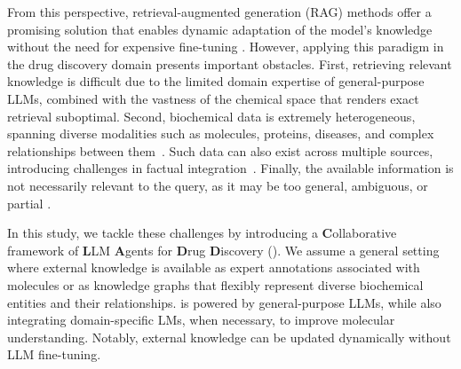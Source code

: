 From this perspective, retrieval-augmented generation (RAG) methods offer a promising solution that enables dynamic adaptation of the model's knowledge without the need for expensive fine-tuning \cite{gao2023retrieval,fan2024survey}.
However, applying this paradigm in the drug discovery domain presents important obstacles. First, retrieving relevant knowledge is difficult due to the limited domain expertise of general-purpose LLMs, combined with the vastness of the chemical space \cite{bohacek1996art} that renders exact retrieval suboptimal.
Second, biochemical data is extremely heterogeneous, spanning diverse modalities such as molecules, proteins, diseases, and complex relationships between them~\cite{wang2023scientific}. Such data can also exist across multiple sources, introducing challenges in factual integration~\cite{harris2023large}.
Finally, the available information is not necessarily relevant to the query, as it may be too general, ambiguous, or partial \cite{vamathevan2019applications}.

In this study, we tackle these challenges by introducing a \textbf{C}ollaborative framework of \textbf{L}LM \textbf{A}gents for \textbf{D}rug \textbf{D}iscovery (\proposed).
We assume a general setting where external knowledge is available as expert annotations associated with molecules or as knowledge graphs that flexibly represent diverse biochemical entities and their relationships. 
\proposed is powered by general-purpose LLMs, while also integrating domain-specific LMs, when necessary, to improve molecular understanding. Notably, external knowledge can be updated dynamically without LLM fine-tuning. %

